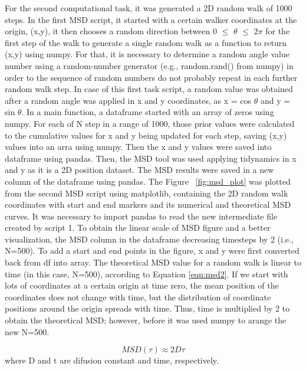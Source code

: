 \documentclass{article}
\begin{document}
For the second computational task, it was generated a 2D random walk of 1000 steps. In the first MSD script, it started with a certain walker coordinates at the origin, (x,y), it then chooses a random direction between 0 $\leq$ $\theta$ $\leq$ $2\pi$ for the first step of the walk to generate a single random walk as a function to return (x,y) using numpy. For that, it is necessary to determine a random angle value number using a random-number generator (e.g., random.rand() from numpy) in order to the sequence of random numbers do not probably repeat in each further random walk step. In case of this first task script, a random value was obtained after a random angle was applied in x and y coordinates, as x = cos $\theta$ and y = sin $\theta$. In a main function, a dataframe started with an array of zeros using numpy. For each of N step in a range of 1000, those prior values were calculated to the cumulative values for x and y being updated for each step, saving (x,y) values into an arra using numpy. Then the x and y values were saved into dataframe using pandas. Then, the MSD tool was used applying tidynamics in x and y as it is a 2D position dataset. The MSD results were saved in a new column of the dataframe using pandas. The Figure ~\ref{fig:msd_plot} was plotted from the second MSD script using matplotlib, containing the 2D random walk coordinates with start and end markers and its numerical and theoretical MSD curves. It was necessary to import pandas to read the new intermediate file created by script 1. To obtain the linear scale of MSD figure and a better visualization, the MSD column in the dataframe decreasing timesteps by 2 (i.e., N=500). To add a start and end points in the figure, x and y were first converted back from df into array. The theoretical MSD value for a random walk is linear to time (in this case, N=500), according to Equation \ref{eqn:msd2}. If we start with lots of coordinates at a certain origin at time zero, the mean position of the coordinates does not change with time, but the distribution of coordinate positions around the origin spreads with time. Thus, time is multiplied by 2 to obtain the theoretical MSD; however, before it was used numpy to arange the new N=500.

\begin{equation}
MSD(\tau) \approx 2 D \tau
\label{eqn:msd2}
\end{equation}
where D and t are difusion constant and time, respectively.
\end{document}
